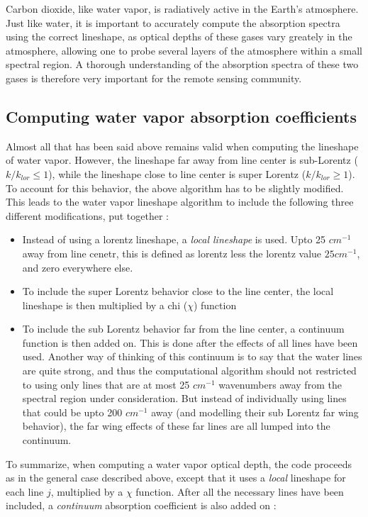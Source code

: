 \documentclass[11pt]{article}
\begin{document}
Carbon dioxide, like water vapor, is radiatively active in the Earth's 
atmosphere. Just like water, it is important to accurately compute the
absorption spectra using the correct lineshape, as optical depths of these
gases vary greately in the atmosphere, allowing one to probe several 
layers of the atmosphere within a small spectral region. A thorough 
understanding of the absorption spectra of these two gases is therefore 
very important for the remote sensing community.

\subsection{Computing water vapor absorption coefficients}
Almost all that has been said above remains valid when computing the 
lineshape of water vapor. However, the lineshape far away from line 
center is sub-Lorentz ($k/k_{lor} \leq 1$), while the lineshape close to 
line center is super Lorentz ($k/k_{lor} \geq 1$).  To account for this 
behavior, the above algorithm has to be slightly modified. This leads to 
the water vapor lineshape algorithm to include the following three 
different modifications, put together : 
\begin{itemize}
\item Instead of using a lorentz lineshape, a {\it local lineshape} is used.
      Upto 25 $cm^{-1}$ away from line cenetr, this is defined as 
      lorentz less the lorentz value \@ $25 cm^{-1}$, and zero everywhere 
      else.
\item To include the super Lorentz behavior close to the line center, 
      the local lineshape is then multiplied by a chi ($\chi$) function
\item To include the sub Lorentz behavior far from the line center, 
      a continuum function is then added on. This is done after the 
      effects of all lines have been used. Another way of thinking of this 
      continuum is to say that the water lines are quite strong, and thus
      the computational algorithm should not restricted to using only lines
      that are at most 25 $cm^{-1}$ wavenumbers away from the spectral 
      region under consideration. But instead of individually using lines 
      that could be upto 200 $cm^{-1}$ away (and modelling their
      sub Lorentz far wing behavior), the far wing effects of these far 
      lines are all lumped into the continuum.
\end{itemize}

To summarize, when computing a water vapor optical depth, the code proceeds
as in the general case described above, except that it uses a {\it local} 
lineshape for each line $j$, multiplied by a $\chi$ function. After all the 
necessary lines have been included, a {\it continuum} absorption coefficient
is also added on : 
\end{document}
